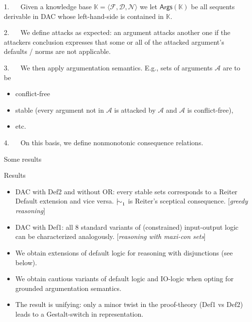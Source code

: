 \documentclass[aspectratio=169]{beamer}
\begin{document}
\begin{frame}[label={sec:org9d76563}]{}
1. ~~ Given a knowledge base \(\mathbb{K} = \langle \mathcal{F}, \mathcal{D}, \mathcal{N} \rangle\) we let \alert{\(\mathsf{Args}(\mathbb{K})\)} be all sequents derivable in DAC whose left-hand-side is contained in \(\mathbb{K}\).
\pause

2. ~~ We define \alert{attacks} as expected: an argument attacks another one if the attackers conclusion expresses that some or all of the attacked argument's defaults / norms are not applicable.
\pause

3. ~~ We then apply \alert{argumentation semantics}. E.g., sets of arguments \(\mathcal{A}\) are to be
\begin{itemize}
\item conflict-free
\item stable (every argument not in \(\mathcal{A}\) is attacked by \(\mathcal{A}\) and \(\mathcal{A}\) is conflict-free),
\item etc.
\end{itemize}
\pause

4. ~~ On this basis, we define nonmonotonic \alert{consequence relations}.

\end{frame}

\begin{frame}[standout]{}
    Some results
\end{frame}

\begin{frame}[label={sec:org09f854e}]{Results}
\begin{itemize}
\item DAC with Def2 and without OR: every stable sets corresponds to a \alert{Reiter Default} extension and vice versa. \(\mathop{\mid\!\sim}_1\) is Reiter's sceptical consequence. \hfill [{\it greedy reasoning}] \pause
\item DAC with Def1: all 8 standard variants of (constrained) \alert{input-output logic} can be characterized analogously. \hfill [{\it reasoning with maxi-con sets}] \pause
\item We obtain extensions of \alert{default logic for reasoning with disjunctions} (see below). \pause
\item We obtain \alert{cautious variants} of default logic and IO-logic when opting for grounded argumentation semantics.  \pause
\item The result is \alert{unifying}: only a minor twist in the proof-theory (Def1 vs Def2) leads to a Gestalt-switch in representation.
\end{itemize}
\end{frame}
\end{document}
